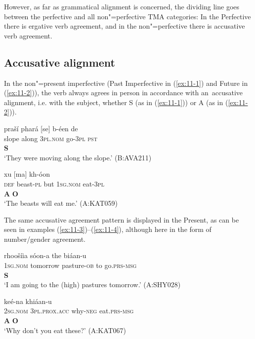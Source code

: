 However, as far as grammatical alignment is concerned, the dividing line goes between the perfective and all non"=perfective TMA categories: In the Perfective there is ergative verb agreement, and in the non"=perfective there is accusative verb agreement. 


\subsection{Accusative alignment}
\label{subsec:11-1-1}


In the non"=present imperfective (Past Imperfective in (\ref{ex:11-1}) and Future in (\ref{ex:11-2})), the verb always agrees in person in accordance with an~accusative alignment, i.e. with the subject, whether S (as in (\ref{ex:11-1})) or A (as in (\ref{ex:11-2})). 

\begin{exe}
\ex
\label{ex:11-1}
\glll praší phará [se] b-éen de \\
slope along \textsc{3pl.nom} go-\textsc{3pl} \textsc{pst} \\
{} {}  \textbf{S} \\
\glt `They were moving along the slope.' (B:AVA211)

\ex
\label{ex:11-2}
 xu [ma] kh-óon \\
\textsc{def} beast-\textsc{pl} but \textsc{1sg.nom} eat-\textsc{3pl} \\
 \textbf{A} {} {}  \textbf{O} \\
\glt `The beasts will eat me.' (A:KAT059)
\end{exe}

The same accusative agreement pattern is displayed in the Present, as can be seen in examples (\ref{ex:11-3})--(\ref{ex:11-4}), although here in the form of number/gender agreement.

\begin{exe}
\ex
\label{ex:11-3}
\glll [ma] rhoošíia sóon-a the biáan-u \\
\textsc{1sg.nom} tomorrow pasture-\textsc{ob} to go.\textsc{prs-}\textsc{msg} \\
\textbf{S} \\
\glt `I am going to the (high) pastures tomorrow.' (A:SHY028)

\ex
\label{ex:11-4}
\glll [tu] [aniaám] keé-na khiáan-u \\
\textsc{2sg.nom} \textsc{3pl.prox.acc} why-\textsc{neg} eat.\textsc{prs-}\textsc{msg} \\
\textbf{A} \textbf{O} \\
\glt `Why don't you eat these?' (A:KAT067)
\end{exe}

